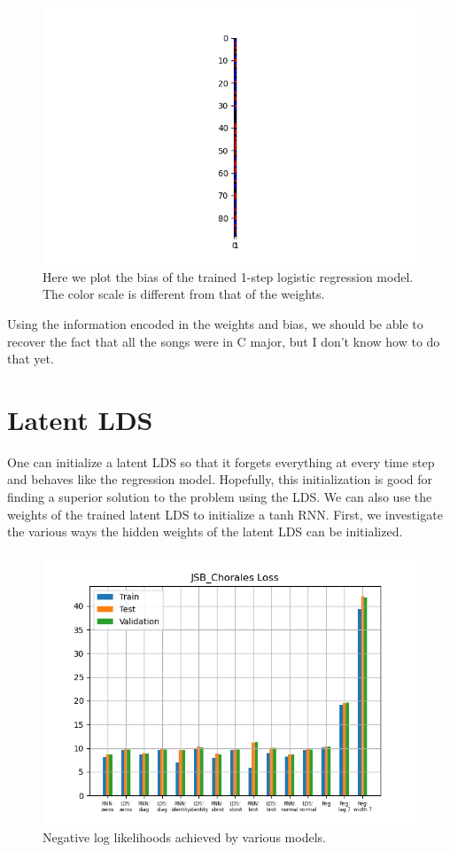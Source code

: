 \documentclass{article}
\begin{document}
\begin{figure}
    \centering
    \includegraphics{figures/regression_bias.png}
    \caption{Here we plot the bias of the trained 1-step logistic regression model. The color scale is different from that of the weights.}
\end{figure}

Using the information encoded in the weights and bias, we should be able to recover the fact that all the songs were in C major, but I don't know how to do that yet.

\section{Latent LDS}

One can initialize a latent LDS so that it forgets everything at every time step and behaves like the regression model. Hopefully, this initialization is good for finding a superior solution to the problem using the LDS. We can also use the weights of the trained latent LDS to initialize a tanh RNN. First, we investigate the various ways the hidden weights of the latent LDS can be initialized.

\begin{figure}
    \centering
    \includegraphics{figures/jsb_losses.png}
    \caption{Negative log likelihoods achieved by various models.}
\end{figure}
\end{document}

